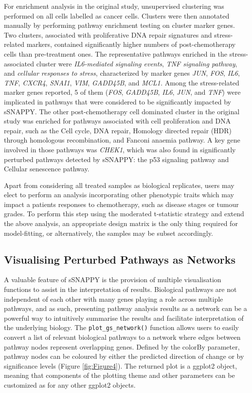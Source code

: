\documentclass[9pt,a4paper,]{extarticle}
\begin{document}
For enrichment analysis in the original study\citep{Zhang2022}, unsupervised clustering was performed on all cells labelled as cancer cells.
Clusters were then annotated manually by performing pathway enrichment testing on cluster marker genes.
Two clusters, associated with proliferative DNA repair signatures and stress-related markers, contained significantly higher numbers of post-chemotherapy cells than pre-treatment ones\citep{Zhang2022}.
The representative pathways enriched in the stress-associated cluster were \emph{IL6-mediated signaling events}, \emph{TNF signaling pathway}, and \emph{cellular responses to stress}, characterized by marker genes \emph{JUN}, \emph{FOS}, \emph{IL6}, \emph{TNF}, \emph{CXCR4}, \emph{SNAI1}, \emph{VIM}, \emph{GADD45B}, and \emph{MCL1.}
Among the stress-related marker genes reported, 5 of them (\emph{FOS}, \emph{GADD45B}, \emph{IL6}, \emph{JUN}, and \emph{TNF}) were implicated in pathways that were considered to be significantly impacted by sSNAPPY.
The other post-chemotherapy cell dominated cluster in the original study was enriched for pathways associated with cell proliferation and DNA repair, such as the Cell cycle, DNA repair, Homology directed repair (HDR) through homologous recombination, and Fanconi anaemia pathway.
A key gene involved in those pathways was \emph{CHEK1}, which was also found in significantly perturbed pathways detected by sSNAPPY: the p53 signaling pathway and Cellular senescence pathway.

Apart from considering all treated samples as biological replicates, users may elect to perform an analysis incorporating other phenotypic traits which may impact a patients responses to chemotherapy, such as disease stages or tumour grades.
To perform this step using the moderated t-statistic strategy and extend the above analysis, an appropriate design matrix is the only thing required for model-fitting, or alternatively, the samples may be subset accordingly.

\hypertarget{visualising-perturbed-pathways-as-networks}{%
\subsection{Visualising Perturbed Pathways as Networks}\label{visualising-perturbed-pathways-as-networks}}

A valuable feature of sSNAPPY is the provision of multiple visualisation functions to assist in the interpretation of results.
Biological pathways are not independent of each other with many genes playing a role across multiple pathways, and as such, presenting pathway analysis results as a network can be a powerful way to intuitively summarise the results and facilitate interpretation of the underlying biology.
The \texttt{plot\_gs\_network()} function allows users to easily convert a list of relevant biological pathways to a network where edges between pathway nodes represent overlapping genes.
Defined by the colorBy parameter, pathway nodes can be coloured by either the predicted direction of change or by significance levels (Figure \ref{fig:Figure4}).
The returned plot is a ggplot2 \citep{Wickham2009} object, meaning that components of the plotting theme and other parameters can be customized as for any other ggplot2 objects.
\end{document}
